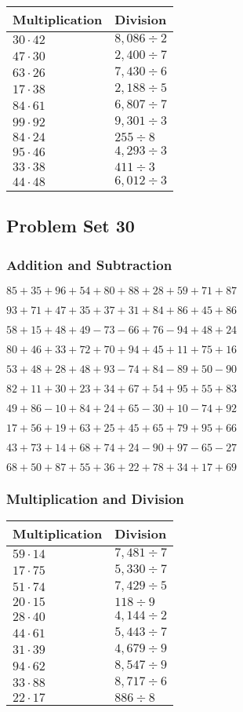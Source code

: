 \begin{longtable}[]{@{}ll@{}}
\toprule
Multiplication & Division\tabularnewline
\midrule
\endhead
\(30\cdot42\) & \(8,086÷2\)\tabularnewline
\(47\cdot30\) & \(2,400÷7\)\tabularnewline
\(63\cdot26\) & \(7,430÷6\)\tabularnewline
\(17\cdot38\) & \(2,188÷5\)\tabularnewline
\(84\cdot61\) & \(6,807÷7\)\tabularnewline
\(99\cdot92\) & \(9,301÷3\)\tabularnewline
\(84\cdot24\) & \(255÷8\)\tabularnewline
\(95\cdot46\) & \(4,293÷3\)\tabularnewline
\(33\cdot38\) & \(411÷3\)\tabularnewline
\(44\cdot48\) & \(6,012÷3\)\tabularnewline
\bottomrule
\end{longtable}

\hypertarget{problem-set-30-1}{%
\subsection{Problem Set 30}\label{problem-set-30-1}}

\hypertarget{addition-and-subtraction-70}{%
\subsubsection{Addition and
Subtraction}\label{addition-and-subtraction-70}}

\(85+35+96+54+80+88+28+59+71+ 87\)

\(93+71+47+35+37+31+84+86+45+86\)

\(58+15+48+49-73-66+76-94+48+24\)

\(80+46+33+72+70+94+45+11+75+16\)

\(53+48+28+48+93-74+84-89+50-90\)

\(82+11+30+23+34+67+54+95+55+83\)

\(49+86-10+84+24+65-30+10-74+92\)

\(17+56+19+63+25+45+65+79+95+66\)

\(43+73+14+68+74+24-90+97-65-27\)

\(68+50+87+55+36+22+78+34+17+69\)

\hypertarget{multiplication-and-division-70}{%
\subsubsection{Multiplication and
Division}\label{multiplication-and-division-70}}

\begin{longtable}[]{@{}ll@{}}
\toprule
Multiplication & Division\tabularnewline
\midrule
\endhead
\(59\cdot14\) & \(7,481÷7\)\tabularnewline
\(17\cdot75\) & \(5,330÷7\)\tabularnewline
\(51\cdot74\) & \(7,429÷5\)\tabularnewline
\(20\cdot15\) & \(118÷9\)\tabularnewline
\(28\cdot40\) & \(4,144÷2\)\tabularnewline
\(44\cdot61\) & \(5,443÷7\)\tabularnewline
\(31\cdot39\) & \(4,679÷9\)\tabularnewline
\(94\cdot62\) & \(8,547÷9\)\tabularnewline
\(33\cdot88\) & \(8,717÷6\)\tabularnewline
\(22\cdot17\) & \(886÷8\)\tabularnewline
\bottomrule
\end{longtable}

